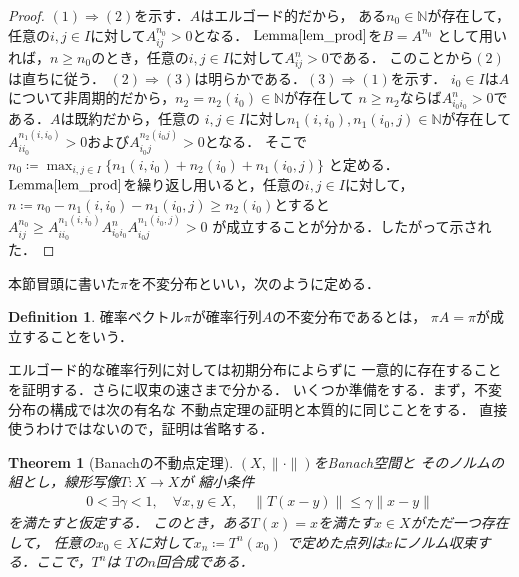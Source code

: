 \documentclass[dvipdfmx,autodetect-engine]{jsarticle}
\newtheorem{theorem}{Theorem}[section]
\theoremstyle{remark}
\theoremstyle{definition}
\newtheorem{definition}{Definition}[section]
\newcommand{\N}{\mathbb{N}}
\begin{document}
\begin{proof}
    $(1)\Rightarrow (2)$を示す．$A$はエルゴード的だから，
    ある$n_0 \in \N$が存在して，任意の$i,j \in I$に対して$A_{ij}^{n_0}>0$となる．
    $\mathrm{Lemma}\ref{lem_prod}$を$B = A^{n_0}$
    として用いれば，$n \geq n_0$のとき，任意の$i,j \in I$に対して$A_{ij}^n >0$である．
    このことから$(2)$は直ちに従う．
    $(2)\Rightarrow (3)$は明らかである．$(3) \Rightarrow (1)$を示す．
    $i_0 \in I$は$A$について非周期的だから，$n_2 = n_2(i_0) \in \N$が存在して
    $n \geq n_2$ならば$A_{i_{0} i_{0}}^{n}>0$である．$A$は既約だから，任意の
    $i,j \in I$に対し$n_1(i,i_0),n_1(i_0,j) \in \N$が存在して
    $A_{i i_0}^{n_1(i,i_0)} > 0$および$A_{i_0 j}^{n_2(i_0 j)}>0$となる．
    そこで$n_0 \coloneqq \max_{i,j \in I} \{n_1(i,i_0) + n_2(i_0) + n_1(i_0,j)\}$
    と定める．$\mathrm{Lemma}\ref{lem_prod}$を繰り返し用いると，任意の$i,j \in I$に対して，
    $n \coloneqq n_0 - n_1(i,i_0) - n_1(i_0,j) \geq n_2(i_0)$とすると
    $A_{ij}^{n_0} \geq A_{i i_0}^{n_1(i,i_0)} A_{i_0 i_0}^{n} A_{i_0 j}^{n_1(i_0,j)}>0$
    が成立することが分かる．したがって示された．
\end{proof}


本節冒頭に書いた$\pi$を不変分布といい，次のように定める．


\begin{definition}
    確率ベクトル$\pi$が確率行列$A$の不変分布であるとは，
    $\pi A = \pi$が成立することをいう．
\end{definition}


エルゴード的な確率行列に対しては初期分布によらずに
一意的に存在することを証明する．さらに収束の速さまで分かる．
いくつか準備をする．まず，不変分布の構成では次の有名な
不動点定理の証明と本質的に同じことをする．
直接使うわけではないので，証明は省略する．


\begin{theorem}[Banachの不動点定理]\label{Banach_contraction}
    $(X, \lVert \cdot \rVert)$をBanach空間と
    そのノルムの組とし，線形写像$T \colon X \to X$が
    縮小条件
    \begin{align}
        0 < \exists \gamma < 1,\quad \forall x,y \in X,\quad 
        \lVert T(x-y)\rVert \leq \gamma \lVert x-y \rVert
    \end{align}
    を満たすと仮定する．
    このとき，ある$T(x) = x$を満たす$x \in X$がただ一つ存在して，
    任意の$x_0 \in X$に対して$x_n \coloneqq T^n (x_0)$
    で定めた点列は$x$にノルム収束する．ここで，$T^n$は
    $T$の$n$回合成である．
\end{theorem}
\end{document}
